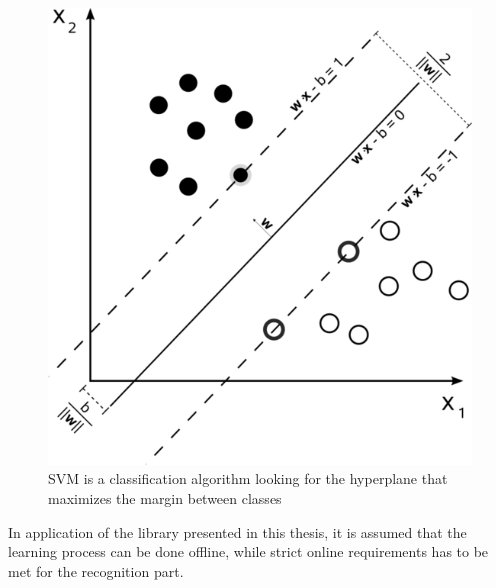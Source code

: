 \begin{figure}[htb]
\centering
 \includegraphics[width=0.6\columnwidth]{figures/SVM.png}
 \caption[]{SVM is a classification algorithm looking for the hyperplane that maximizes the margin between classes\footnotemark}
 \label{svmmargin}
\end{figure}

In application of the library presented in this thesis, it is assumed that the learning process can be done offline, while strict online requirements has to be met for the recognition part. 

